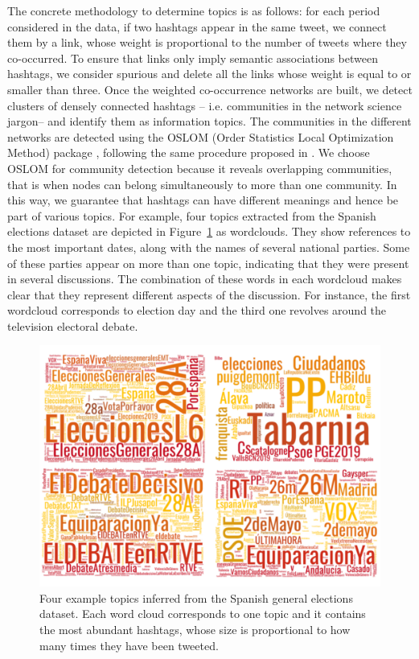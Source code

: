 The concrete methodology to determine topics is as follows: for each period considered in the data, if two hashtags appear in the same tweet, we connect them by a link, whose weight is proportional to the number of tweets where they co-occurred. To ensure that links only imply semantic associations between hashtags, we consider spurious and delete all the links whose weight is equal to or smaller than three. Once the weighted co-occurrence networks are built, we detect clusters of densely connected hashtags -- i.e. communities in the network science jargon-- and identify them as information topics. The communities in the different networks are detected using the OSLOM (Order Statistics Local Optimization Method) package \cite{lancichinetti2011oslom}, following the same procedure proposed in \cite{cardoso2019topics,mussi2021topics}. We choose OSLOM for community detection because it reveals overlapping communities, that is when nodes can belong simultaneously to more than one community. In this way, we guarantee that hashtags can have different meanings and hence be part of various topics. For example, four topics extracted from the Spanish elections dataset are depicted in Figure~\ref{chp3:fig:2} as wordclouds. They show  references to the most important dates, along with the names of several national parties. Some of these parties appear on more than one topic, indicating that they were present in several discussions. The combination of these words in each wordcloud makes clear that they represent different aspects of the discussion. For instance, the first wordcloud corresponds to election day and the third one revolves around the television electoral debate.\\
\begin{figure}[t!]
    \centering
   \includegraphics[width=1\textwidth]{figures/chp3/fig2.pdf}
   
    \caption[Word clouds of inferred topics]{Four example topics inferred from the Spanish general elections dataset. Each word cloud corresponds to one topic and it contains the most abundant hashtags, whose size is proportional to how many times they have been tweeted.}
   \label{chp3:fig:2}
\end{figure}

